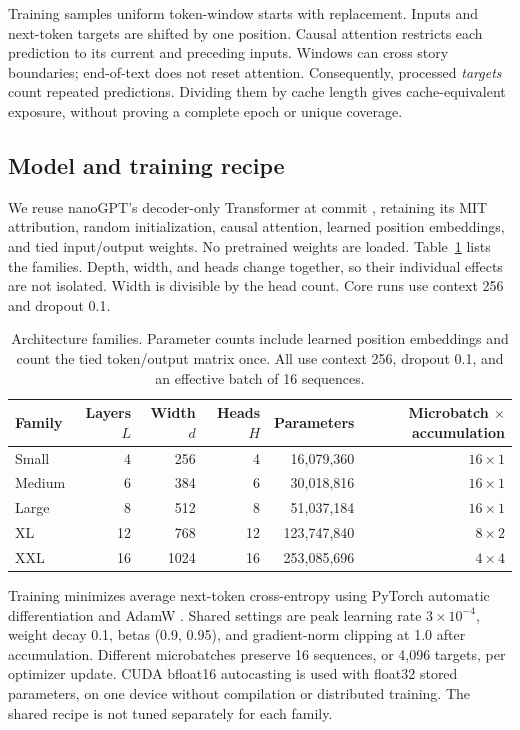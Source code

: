 \documentclass[10pt,twocolumn,letterpaper]{article}
\begin{document}
Training samples uniform token-window starts with replacement. Inputs and
next-token targets are shifted by one position. Causal attention restricts each
prediction to its current and preceding inputs. Windows can cross story
boundaries; end-of-text does not reset attention. Consequently, processed
\emph{targets} count repeated predictions. Dividing them by cache length gives
cache-equivalent exposure, without proving a complete epoch or unique coverage.

\subsection{Model and training recipe}

We reuse nanoGPT's decoder-only Transformer \citep{vaswani2017,nanogpt} at commit
, retaining its MIT attribution, random initialization, causal
attention, learned position embeddings, and tied input/output weights. No
pretrained weights are loaded. Table~\ref{tab:architectures} lists the families.
Depth, width, and heads change together, so their individual effects are not
isolated. Width is divisible by the head count. Core runs use context 256 and
dropout 0.1.

\begin{table}[t]
\centering\small
\caption{Architecture families. Parameter counts include learned position
embeddings and count the tied token/output matrix once. All use context 256,
dropout 0.1, and an effective batch of 16 sequences.}
\label{tab:architectures}
\begin{tabular}{lrrrrr}
\toprule
Family & Layers $L$ & Width $d$ & Heads $H$ & Parameters & Microbatch $\times$ accumulation\\
\midrule
Small  & 4  & 256  & 4  & 16,079,360  & $16\times1$\\
Medium & 6  & 384  & 6  & 30,018,816  & $16\times1$\\
Large  & 8  & 512  & 8  & 51,037,184  & $16\times1$\\
XL     & 12 & 768  & 12 & 123,747,840 & $8\times2$\\
XXL    & 16 & 1024 & 16 & 253,085,696 & $4\times4$\\
\bottomrule
\end{tabular}
\end{table}

Training minimizes average next-token cross-entropy using PyTorch automatic
differentiation and AdamW \citep{adamw2019}. Shared settings are peak learning
rate $3\times10^{-4}$, weight decay 0.1, betas (0.9, 0.95), and gradient-norm
clipping at 1.0 after accumulation. Different microbatches preserve 16 sequences,
or 4,096 targets, per optimizer update. CUDA bfloat16 autocasting is used with
float32 stored parameters, on one device without compilation or distributed
training. The shared recipe is not tuned separately for each family.
\end{document}
